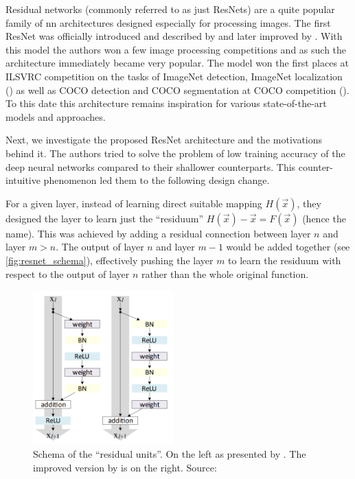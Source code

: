Residual networks (commonly referred to as just ResNets) are a quite popular family of \gls{nn} architectures designed especially for processing images. The first ResNet was officially introduced and described by \cite{resnet} and later improved by \cite{resnetimp}. With this model the authors won a few image processing competitions and as such the architecture immediately became very popular. The model won the first places at ILSVRC competition on the tasks of ImageNet detection, ImageNet localization (\cite{imagenetresults}) as well as COCO detection and COCO segmentation at COCO competition (\cite{cocodataset}). To this date this architecture remains inspiration for various state-of-the-art models and approaches.

Next, we investigate the proposed ResNet architecture and the motivations behind it. The authors tried to solve the problem of low training accuracy of the deep neural networks compared to their shallower counterparts. This counter-intuitive phenomenon led them to the following design change.

For a given layer, instead of learning direct suitable mapping $H(\vec{x})$, they designed the layer to learn just the ``residuum'' $H(\vec{x}) - \vec{x} = F(\vec{x})$ (hence the name). This was achieved by adding a residual connection between layer $n$ and layer $m > n$. The output of layer $n$ and layer $m - 1$ would be added together (see \autoref{fig:resnet_schema}), effectively pushing the layer $m$ to learn the residuum with respect to the output of layer $n$ rather than the whole original function.

\begin{figure}
    \centering
    \includegraphics[width=0.48\textwidth]{img/resnetv2.png}
    \caption[Residual units]{Schema of the ``residual units''. On the left as presented by \cite{resnet}. The improved version by \cite{resnetimp} is on the right. Source: \cite{resnetimp}}
    \label{fig:resnet_schema}
\end{figure}

